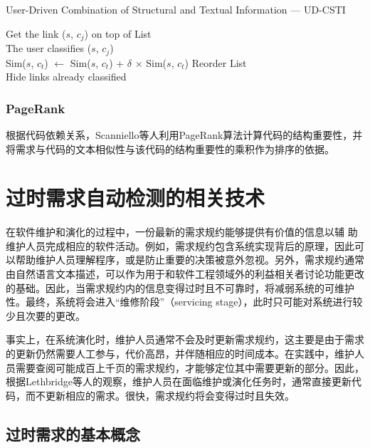 \begin{algorithm}[htbp]
\caption{User-Driven Combination of Structural and Textual Information — UD-CSTI}
\label{alg:UD_CSTI}
    {
      Get the link ($s$, $c_{j}$) on top of List\\
      The user classifies ($s$, $c_{j}$)\\
       {
           {
             {
              Sim($s$, $c_{t}$) $\leftarrow$ Sim($s$, $c_{t}$) + $\delta$ $\times$ Sim($s$, $c_{t}$)
            }
          }
       }
      Reorder List\\
      Hide links already classified
    }
\end{algorithm}

\subsubsection{PageRank}
根据代码依赖关系，Scanniello等人\cite{scanniello2015link}利用PageRank算法计算代码的结构重要性，并将需求与代码的文本相似性与该代码的结构重要性的乘积作为排序的依据。

\section{过时需求自动检测的相关技术}

在软件维护和演化的过程中，一份最新的需求规约能够提供有价值的信息以辅 助维护人员完成相应的软件活动。例如，需求规约包含系统实现背后的原理，因此可以帮助维护人员理解程序，或是防止重要的决策被意外忽视。另外，需求规约通常由自然语言文本描述，可以作为用于和软件工程领域外的利益相关者讨论功能更改的基础。因此，当需求规约内的信息变得过时且不可靠时，将减弱系统的可维护性。最终，系统将会进入“维修阶段”（servicing stage）\cite{bennett2000software}，此时只可能对系统进行较少且次要的更改。

事实上，在系统演化时，维护人员通常不会及时更新需求规约\cite{bennett2000software,lethbridge2003software}，这主要是由于需求的更新仍然需要人工参与，代价高昂，并伴随相应的时间成本。在实践中，维护人员需要查阅可能成百上千页的需求规约，才能够定位其中需要更新的部分。因此，根据Lethbridge等人\cite{lethbridge2003software}的观察，维护人员在面临维护或演化任务时，通常直接更新代码，而不更新相应的需求。很快，需求规约将会变得过时且失效。

\subsection{过时需求的基本概念}


